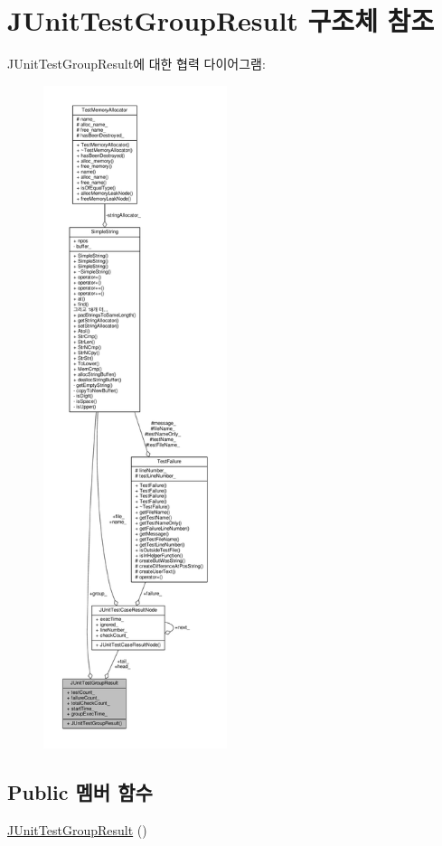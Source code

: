 \hypertarget{struct_j_unit_test_group_result}{}\section{J\+Unit\+Test\+Group\+Result 구조체 참조}
\label{struct_j_unit_test_group_result}


J\+Unit\+Test\+Group\+Result에 대한 협력 다이어그램\+:
\nopagebreak
\begin{figure}[H]
\begin{center}
\leavevmode
\includegraphics[height=550pt]{struct_j_unit_test_group_result__coll__graph}
\end{center}
\end{figure}
\subsection*{Public 멤버 함수}
\begin{DoxyCompactItemize}
\item 
\hyperlink{struct_j_unit_test_group_result_aa6b21feb1d6de77d5c6d360ba4043a2e}{J\+Unit\+Test\+Group\+Result} ()
\end{DoxyCompactItemize}
